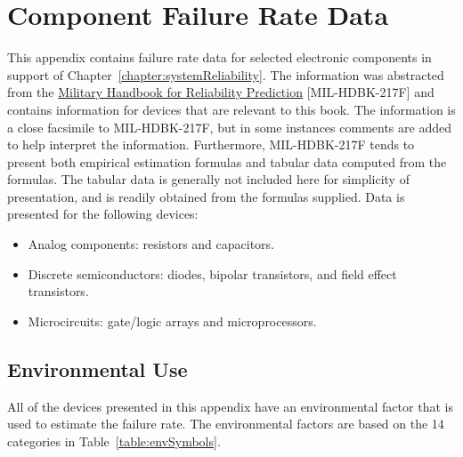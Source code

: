 \chapter{Component Failure Rate Data}
\label{appendix:componentFailureRate}
\graphicspath{ {./appendixC/Fig} }

This appendix contains failure rate data for selected electronic
components in support of Chapter~\ref{chapter:systemReliability}. 
The information was abstracted from
the \ul{Military Handbook for Reliability Prediction}
{[}MIL-HDBK-217F{]} and contains information for devices that are
relevant to this book. The information is a close facsimile to
MIL-HDBK-217F, but in some instances comments are added to help
interpret the information. Furthermore, MIL-HDBK-217F tends to present
both empirical estimation formulas and tabular data computed from the
formulas. The tabular data is generally not included here for simplicity
of presentation, and is readily obtained from the formulas supplied.
Data is presented for the following devices:

\begin{itemize}
\item  Analog components: resistors and capacitors.
\item  Discrete semiconductors: diodes, bipolar transistors, and field effect  transistors.
\item  Microcircuits: gate/logic arrays and microprocessors.
\end{itemize}

\section{Environmental Use}
\label{section:environmental-use}

All of the devices presented in this appendix have an environmental
factor that is used to estimate the failure rate. The environmental
factors are based on the 14 categories in Table~\ref{table:envSymbols}.



